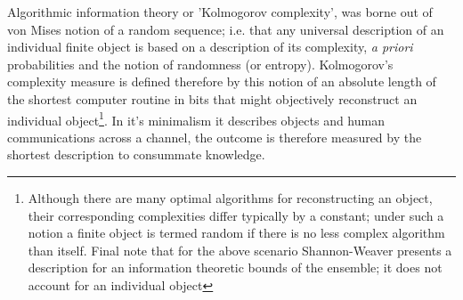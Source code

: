 \documentclass[7pt]{article}
\begin{document}
  Algorithmic information theory or 'Kolmogorov complexity', was borne out of von Mises notion of a random sequence; i.e. that any universal description of an individual finite object is based on a  description of its complexity, \emph{a priori} probabilities and the notion of randomness (or entropy). Kolmogorov's complexity measure is defined therefore by this notion of an absolute length of the shortest computer routine in bits that might objectively reconstruct an individual object\footnote{Although there are many optimal algorithms for reconstructing an object, their corresponding complexities differ typically by a constant; under such a notion a finite object is termed random if there is no less complex algorithm than  itself. Final  note that for the above scenario Shannon-Weaver presents a description for an information theoretic bounds of the ensemble; it does not account for an individual object }. In it's minimalism it describes objects and human communications across a channel, the outcome is therefore measured by the shortest description  to consummate knowledge.
\vspace{0.15in}
\end{document}
